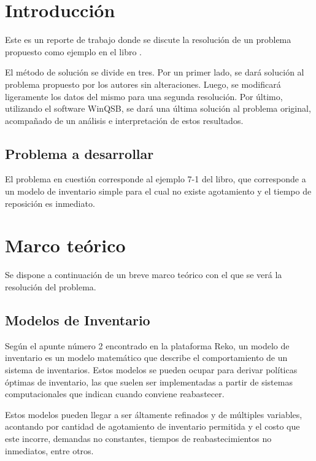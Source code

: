 \section{Introducción}
Este es un reporte de trabajo donde se discute la resolución de un problema propuesto como ejemplo en el libro \cite{acwinqsb}.

El método de solución se divide en tres. Por un primer lado, se dará solución al problema propuesto por los autores sin alteraciones. Luego, se modificará ligeramente los datos del mismo para una segunda resolución. Por último, utilizando el software WinQSB, se dará una última solución al problema original, acompañado de un análisis e interpretación de estos resultados.

\subsection{Problema a desarrollar}

El problema en cuestión corresponde al ejemplo 7-1 del libro, que corresponde a un modelo de inventario simple para el cual no existe agotamiento y el tiempo de reposición es inmediato.

\clearpage

\section{Marco teórico}
Se dispone a continuación de un breve marco teórico con el que se verá la resolución del problema.
\subsection{Modelos de Inventario}
Según el apunte número 2 encontrado en la plataforma Reko\cite{apunte}, un modelo de inventario es un modelo matemático que describe el comportamiento de un sistema de inventarios. Estos modelos se pueden ocupar para derivar políticas óptimas de inventario, las que suelen ser implementadas a partir de sistemas computacionales que indican cuando conviene reabastecer.

Estos modelos pueden llegar a ser áltamente refinados y de múltiples variables, acontando por cantidad de agotamiento de inventario permitida y el costo que este incorre, demandas no constantes, tiempos de reabastecimientos no inmediatos, entre otros.


